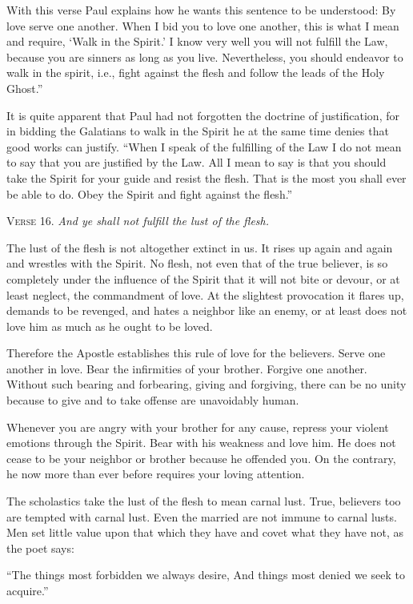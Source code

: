 With this verse Paul explains how he wants this sentence to be understood: By love serve one another. When I bid you to love one another, this is what I mean and require, ‘Walk in the Spirit.’ I know very well you will not fulfill the Law, because you are sinners as long as you live. Nevertheless, you should endeavor to walk in the spirit, i.e., fight against the flesh and follow the leads of the Holy Ghost.”

It is quite apparent that Paul had not forgotten the doctrine of justification, for in bidding the Galatians to walk in the Spirit he at the same time denies that good works can justify. “When I speak of the fulfilling of the Law I do not mean to say that you are justified by the Law. All I mean to say is that you should take the Spirit for your guide and resist the flesh. That is the most you shall ever be able to do. Obey the Spirit and fight against the flesh.”

\textsc{Verse} 16. \emph{And ye shall not fulfill the lust of the flesh.}

The lust of the flesh is not altogether extinct in us. It rises up again and again and wrestles with the Spirit. No flesh, not even that of the true believer, is so completely under the influence of the Spirit that it will not bite or devour, or at least neglect, the commandment of love. At the slightest provocation it flares up, demands to be revenged, and hates a neighbor like an enemy, or at least does not love him as much as he ought to be loved.

Therefore the Apostle establishes this rule of love for the believers. Serve one another in love. Bear the infirmities of your brother. Forgive one another. Without such bearing and forbearing, giving and forgiving, there can be no unity because to give and to take offense are unavoidably human.

Whenever you are angry with your brother for any cause, repress your violent emotions through the Spirit. Bear with his weakness and love him. He does not cease to be your neighbor or brother because he offended you. On the contrary, he now more than ever before requires your loving attention.

The scholastics take the lust of the flesh to mean carnal lust. True, believers too are tempted with carnal lust. Even the married are not immune to carnal lusts. Men set little value upon that which they have and covet what they have not, as the poet says:

“The things most forbidden we always desire,  And things most denied we seek to acquire.”

